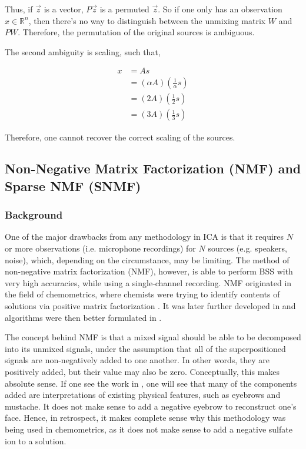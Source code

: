 Thus, if $\overrightarrow{z}$ is a vector, $P\overrightarrow{z}$ is a permuted $\overrightarrow{z}$. So if one only has an observation $x \in \mathbb{R}^n$, then there's no way to distinguish between the unmixing matrix $W$ and $PW$. Therefore, the permutation of the original sources is ambiguous.

The second ambiguity is scaling, such that,

\begin{align*}
    x &= As \\
    &= (\alpha A)\left( \frac{1}{\alpha} s\right) \\
    &= (2 A)\left( \frac{1}{2} s\right) \\
    &= (3 A)\left( \frac{1}{3} s\right)
\end{align*}

Therefore, one cannot recover the correct scaling of the sources.


\subsection{Non-Negative Matrix Factorization (NMF) and Sparse NMF (SNMF)} \label{sec:NMF}
\subsubsection{Background}
One of the major drawbacks from any methodology in ICA is that it requires $N$ or more observations (i.e. microphone recordings) for $N$ sources (e.g. speakers, noise), which, depending on the circumstance, may be limiting. The method of non-negative matrix factorization (NMF), however, is able to perform BSS with very high accuracies, while using a single-channel recording. NMF originated in the field of chemometrics, where chemists were trying to identify contents of solutions via positive matrix factorization \cite{pmf} \cite{pmf_chem}. It was later further developed in \cite{nmf1} and algorithms were then better formulated in \cite{nmf2}.

The concept behind NMF is that a mixed signal should be able to be decomposed into its unmixed signals, under the assumption that all of the superpositioned signals are non-negatively added to one another. In other words, they are positively added, but their value may also be zero. Conceptually, this makes absolute sense. If one see the work in \cite{nmf1}, one will see that many of the components added are interpretations of existing physical features, such as eyebrows and mustache. It does not make sense to add a negative eyebrow to reconstruct one's face. Hence, in retrospect, it makes complete sense why this methodology was being used in chemometrics, as it does not make sense to add a negative sulfate ion to a solution.

